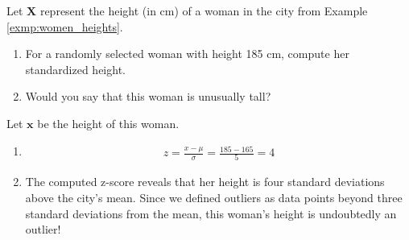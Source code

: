 \begin{exmp}
    Let \( \bm{X} \) represent the height (in cm) of a woman in the city from Example \autoref{exmp:women_heights}.
    \begin{enumerate}
        \item For a randomly selected woman with height 185 cm, compute her standardized height.
        \item Would you say that this woman is unusually tall?
    \end{enumerate}
\end{exmp}
\begin{solution}
    Let \( \bm{x} \) be the height of this woman.
    \begin{enumerate}
        \item \begin{gather*}
            z = \frac{x - \mu}{\sigma} = \frac{185 - 165}{5} = 4
        \end{gather*}
        \item The computed z-score reveals that her height is four standard deviations above the city's mean.
        Since we defined outliers as data points beyond three standard deviations from the mean,
        this woman's height is undoubtedly an outlier!
    \end{enumerate}
\end{solution}